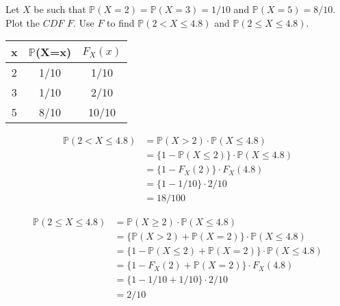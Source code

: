 \item Let $X$ be such that $\mathbb{P}(X=2)=\mathbb{P}(X=3)=1/10$ and $\mathbb{P}(X=5)=8/10$. Plot the $CDF$ $F$.
Use $F$ to find $\mathbb{P}(2<X\le4.8)$ and $\mathbb{P}(2 \le X \le 4.8)$.

\begin{tabular}{c|c c}
  x & $\mathbb{P}$(X=x) & $F_X(x)$ \\
  \hline
  2 & 1/10 & 1/10 \\
  3 & 1/10 & 2/10 \\
  5 & 8/10 & 10/10 \\
\end{tabular}


\begin{align*}
\mathbb{P}(2<X\le4.8) & = \mathbb{P}(X>2) \cdot \mathbb{P}(X\le4.8)
\\&= \big\{1 - \mathbb{P}(X\le2) \big\} \cdot \mathbb{P}(X\le4.8)
\\&= \big\{1 - F_X(2) \big\} \cdot F_X(4.8)
\\&= \big\{1 - 1/10 \big\} \cdot 2/10
\\&= 18/100
\end{align*}

\begin{align*}
\mathbb{P}(2 \le X\le4.8) & = \mathbb{P}(X \ge 2) \cdot \mathbb{P}(X\le4.8)
\\&= \big\{\mathbb{P}(X>2) + \mathbb{P}(X=2)\big\} \cdot \mathbb{P}(X\le4.8)
\\&= \big\{ 1 - \mathbb{P}(X\le2) + \mathbb{P}(X=2) \big\} \cdot \mathbb{P}(X\le4.8)
\\&= \big\{1 - F_X(2) + \mathbb{P}(X=2)\big\} \cdot F_X(4.8)
\\&= \big\{1 - 1/10 + 1/10\big\} \cdot 2/10
\\&= 2/10
\end{align*}
